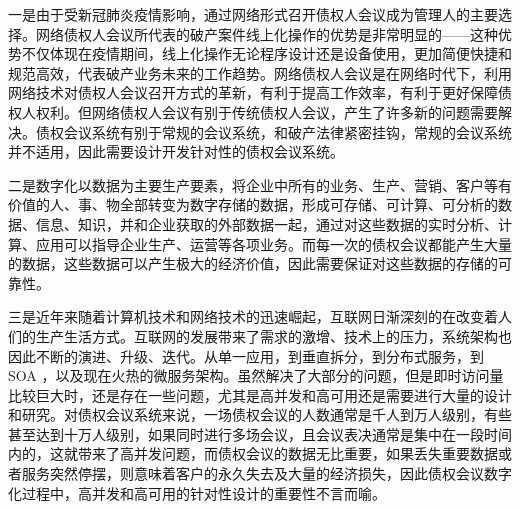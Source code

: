 一是由于受新冠肺炎疫情影响，通过网络形式召开债权人会议成为管理人的主要选择。网络债权人会议所代表的破产案件线上化操作的优势是非常明显的——这种优势不仅体现在疫情期间，线上化操作无论程序设计还是设备使用，更加简便快捷和规范高效，代表破产业务未来的工作趋势。网络债权人会议是在网络时代下，利用网络技术对债权人会议召开方式的革新，有利于提高工作效率，有利于更好保障债权人权利。但网络债权人会议有别于传统债权人会议，产生了许多新的问题需要解决。债权会议系统有别于常规的会议系统，和破产法律紧密挂钩，常规的会议系统并不适用，因此需要设计开发针对性的债权会议系统。

二是数字化以数据为主要生产要素，将企业中所有的业务、生产、营销、客户等有价值的人、事、物全部转变为数字存储的数据，形成可存储、可计算、可分析的数据、信息、知识，并和企业获取的外部数据一起，通过对这些数据的实时分析、计算、应用可以指导企业生产、运营等各项业务。而每一次的债权会议都能产生大量的数据，这些数据可以产生极大的经济价值，因此需要保证对这些数据的存储的可靠性。

三是近年来随着计算机技术和网络技术的迅速崛起，互联网日渐深刻的在改变着人们的生产生活方式。互联网的发展带来了需求的激增、技术上的压力，系统架构也因此不断的演进、升级、迭代。从单一应用，到垂直拆分，到分布式服务，到 SOA ，以及现在火热的微服务架构。虽然解决了大部分的问题，但是即时访问量比较巨大时，还是存在一些问题，尤其是高并发和高可用还是需要进行大量的设计和研究。对债权会议系统来说，一场债权会议的人数通常是千人到万人级别，有些甚至达到十万人级别，如果同时进行多场会议，且会议表决通常是集中在一段时间内的，这就带来了高并发问题，而债权会议的数据无比重要，如果丢失重要数据或者服务突然停摆，则意味着客户的永久失去及大量的经济损失，因此债权会议数字化过程中，高并发和高可用的针对性设计的重要性不言而喻。




